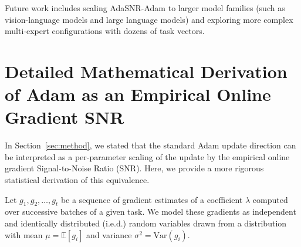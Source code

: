 \documentclass{article}
\theoremstyle{plain}
\theoremstyle{definition}
\theoremstyle{remark}
\begin{document}
Future work includes scaling AdaSNR-Adam to larger model families (such as vision-language models and large language models) and exploring more complex multi-expert configurations with dozens of task vectors.




\newpage
\appendix
\onecolumn

\section{Detailed Mathematical Derivation of Adam as an Empirical Online Gradient SNR}
\label{app:derivation}

In Section~\ref{sec:method}, we stated that the standard Adam update direction can be interpreted as a per-parameter scaling of the update by the empirical online gradient Signal-to-Noise Ratio (SNR). Here, we provide a more rigorous statistical derivation of this equivalence.

Let $g_1, g_2, \dots, g_t$ be a sequence of gradient estimates of a coefficient $\lambda$ computed over successive batches of a given task. We model these gradients as independent and identically distributed (i.e.d.) random variables drawn from a distribution with mean $\mu = \mathbb{E}[g_i]$ and variance $\sigma^2 = \text{Var}(g_i)$.
\end{document}
